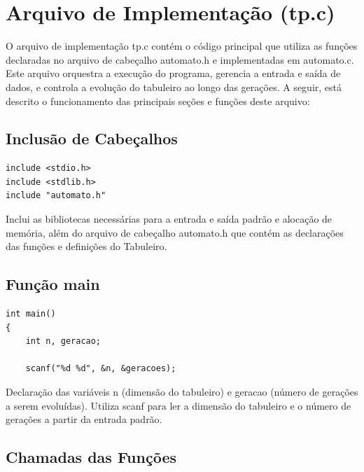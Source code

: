 \documentclass{article}
\begin{document}
\section{Arquivo de Implementação (tp.c)}

O arquivo de implementação tp.c contém o código principal que utiliza as funções declaradas no arquivo de cabeçalho automato.h e implementadas em automato.c. Este arquivo orquestra a execução do programa, gerencia a entrada e saída de dados, e controla a evolução do tabuleiro ao longo das gerações. A seguir, está descrito o funcionamento das principais seções e funções deste arquivo:

 \subsection{Inclusão de Cabeçalhos}


\begin{lstlisting}[caption={},label={lst:cod1},language={[x86masm]Assembler}]
include <stdio.h>
include <stdlib.h>
include "automato.h"

 \end{lstlisting}

\par Inclui as bibliotecas necessárias para a entrada e saída padrão e alocação de memória, além do arquivo de cabeçalho automato.h que contém as declarações das funções e definições do Tabuleiro.

\subsection{Função main}

\begin{lstlisting}[caption={},label={lst:cod1},language={[x86masm]Assembler}]
int main()
{
    int n, geracao;

    scanf("%d %d", &n, &geracoes);

 \end{lstlisting}

 \par Declaração das variáveis n (dimensão do tabuleiro) e geracao (número de gerações a serem evoluídas). Utiliza scanf para ler a dimensão do tabuleiro e o número de gerações a partir da entrada padrão.

\subsection{Chamadas das Funções}
\end{document}

